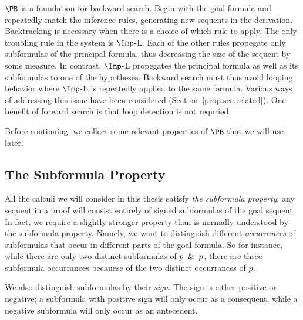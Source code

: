 % 
% 

$\PB$ is a foundation for backward search.  Begin with the goal formula and
repeatedly match the inference rules, generating new sequents in the derivation.
Backtracking is necessary when there is a choice of which rule to apply.  The
only troubling rule in the system is $\Imp$-L.  Each of the other rules
propegate only subformulas of the principal formula, thus decreasing the
size of the sequent by some measure.  In contrast, $\Imp$-L
propegates the principal formula as well as its subformulas to one of the
hypotheses.  Backward search must thus avoid looping behavior where $\Imp$-L is
repeatedly applied to the same formula.  Various ways of addressing this issue
have been considered (Section~\ref{prop.sec.related}).  One benefit of forward
search is that loop detection is not requried.

Before continuing, we collect some relevant
properties of $\PB$ that we will use later.

\subsection{The Subformula Property}

All the calculi we will consider in this thesis satisfy \emph{the subformula
property};  any sequent in a proof will consist entirely of signed subformulas
of the goal sequent.  In fact, we require a slightly stronger property than is normally
understood by the subformula property.
  Namely, we want to distinguish
different \emph{occurrances} of subformulas that occur in different parts of the goal
formula.  So for instance, while there are only two distinct subformulas of
$p\And p$, there are three subformula occurrances
becauese of the two distinct occurrances of $p$.

We also distinguish subformulas by their \emph{sign}.  The sign is either
positive or negative; a subformula with positive sign will only occur
as a consequent, while a negative subformula will only occur as an
antecedent.

